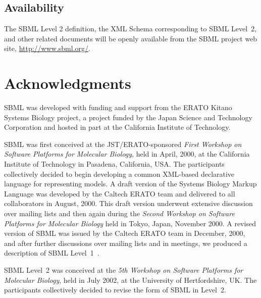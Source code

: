 \documentclass[10pt,twocolumntoc]{cekarticle}
\begin{document}

\subsection{Availability}
\label{sec:availability}

The SBML Level 2 definition, the XML Schema corresponding to SBML Level~2,
and other related documents will be openly available from the SBML project
web site, \url{http://www.sbml.org/}.


\setcounter{secnumdepth}{-1}
\section{Acknowledgments}
\label{sec:acknowledgements}

SBML was developed with funding and support from the ERATO Kitano Systems
Biology project, a project funded by the Japan Science and Technology
Corporation and hosted in part at the California Institute of Technology.

SBML was first conceived at the JST/ERATO-sponsored \emph{First Workshop on
  Software Platforms for Molecular Biology}, held in April, 2000, at the
California Institute of Technology in Pasadena, California, USA.  The
participants collectively decided to begin developing a common XML-based
declarative language for representing models.  A draft version of the
Systems Biology Markup Language was developed by the Caltech ERATO team and
delivered to all collaborators in August, 2000.  This draft version
underwent extensive discussion over mailing lists and then again during the
\emph{Second Workshop on Software Platforms for Molecular Biology} held in
Tokyo, Japan, November 2000.  A revised version of SBML was issued by the
Caltech ERATO team in December, 2000, and after further discussions over
mailing lists and in meetings, we produced a description of SBML
Level~1~\citep{hucka:2001}.

SBML Level~2 was conceived at the \emph{5th Workshop on Software Platforms
  for Molecular Biology}, held in July 2002, at the University of
Hertfordshire, UK.  The participants collectively decided to revise the
form of SBML in Level~2.
\end{document}
